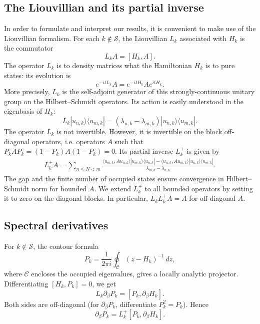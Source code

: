 \documentclass[a4paper,11pt]{article}
\theoremstyle{plain}
\theoremstyle{remark}
\begin{document}
\subsection{The Liouvillian and its partial inverse}
\label{sec:louvillian_intro}
In order to formulate and interpret our results, it is convenient to make use of the Liouvillian formalism. For each $k\notin\mathcal S$, the Liouvillian
$L_k$ associated with $H_k$ is the commutator
\begin{equation}\label{eq:Liouvillian}
L_k A=[H_k,A].
\end{equation}
The operator $L_k$ is to density matrices what the Hamiltonian $H_k$ is
to pure states: its evolution is
\begin{equation}\label{eq:Liouvillian2}
e^{-itL_k}A=e^{-itH_k}Ae^{itH_k}.
\end{equation}
More precisely, $L_k$ is the self-adjoint generator of this
strongly-continuous unitary group on the Hilbert--Schmidt operators.
Its action is easily understood in the eigenbasis of $H_k$:
\[
L_k|u_{n,k}\rangle\langle u_{m,k}|=
(\lambda_{n,k}-\lambda_{m,k})|u_{n,k}\rangle\langle u_{m,k}|.
\]
The operator $L_k$ is not invertible. However, it is invertible
on the block off-diagonal operators, i.e. operators $A$ such that
$P_kAP_k=(1-P_k)A(1-P_k)=0$. Its partial inverse $L_k^+$ is given by
\begin{align}\label{eq:explicit_inverse_liouvillian}
L_k^+A=\sum_{n\le N<m}
\frac{\langle u_{m,k},Au_{n,k}\rangle
 |u_{m,k}\rangle\langle u_{n,k}|
-\langle u_{n,k},Au_{m,k}\rangle
 |u_{n,k}\rangle\langle u_{m,k}|}
{\lambda_{m,k}-\lambda_{n,k}}.
\end{align}
The gap and the finite number of occupied states ensure convergence in
Hilbert--Schmidt norm for bounded $A$. We extend $L_k^+$ to all bounded
operators by setting it to zero on the diagonal blocks. In particular,
$L_kL_k^+A=A$ for off-diagonal $A$.

\subsection{Spectral derivatives}
For $k\notin\mathcal S$, the contour formula
\begin{equation}\label{eq:int_rep}
P_k=\frac{1}{2\pi i}\oint_{\mathcal C}(z-H_k)^{-1}\,dz,
\end{equation}
where $\mathcal C$ encloses the occupied eigenvalues, gives a locally
analytic projector. Differentiating $[H_k,P_k]=0$, we get
\[
L_k\partial_\beta P_k=[P_k,\partial_\beta H_k].
\]
Both sides are off-diagonal (for $\partial_\beta P_k$, differentiate
$P_k^2=P_k$). Hence
\begin{equation}\label{eq:Pprime}
\partial_\beta P_k=L_k^+[P_k,\partial_\beta H_k].
\end{equation}
\end{document}

